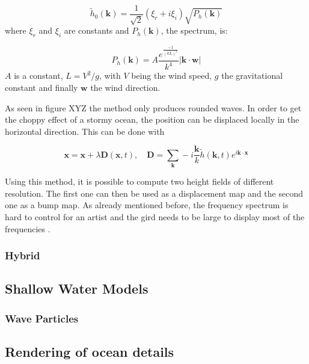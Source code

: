\begin{equation}\label{eq:tessendorf_h0}
    \tilde{h}_0(\textbf{k}) = \frac{1}{\sqrt{2}}(\xi_r +
    i\xi_i)\sqrt{P_h(\textbf{k})}
\end{equation}
%
where $\xi_r$ and $\xi_i$ are constants and $P_h(\textbf{k})$, the spectrum, is:

\begin{equation}
    P_h(\textbf{k}) = A\frac{e^{\frac{-1}{{(kL)}^2}}}{k^4}
    |\textbf{k}\cdot\textbf{w}|
\end{equation}
%
$A$ is a constant, $L=V^2/g$, with $V$ being the wind speed, $g$ the
gravitational constant and finally $\textbf{w}$ the wind direction.

As seen in figure XYZ the method only produces rounded waves. In order to get
the choppy effect of a stormy ocean, the position can be displaced locally in
the horizontal direction. This can be done with

\begin{equation}
    \textbf{x} = \textbf{x} + \lambda \textbf{D}(\textbf{x}, t), \quad
    \textbf{D} = \sum_{\textbf{k}}^{} -i\frac{\textbf{k}}{k}
    \tilde{h}(\textbf{k},t) e^{i\textbf{k}\cdot\textbf{x}}
\end{equation}


Using this method, it is possible to compute two height fields of different
resolution. The first one can then be used as a displacement map and the second
one as a bump map.
As already mentioned before, the frequency spectrum is hard to control for an
artist and the gird needs to be large to display most of the frequencies
\autocite{gonzalez2016rendering}.


\subsubsection{Hybrid}

\subsection{Shallow Water Models}\label{subsec:shallow_water}

\subsubsection{Wave Particles}\label{subsub:wave_particles}

\subsection{Rendering of ocean details}\label{subsec:ocean_details}


